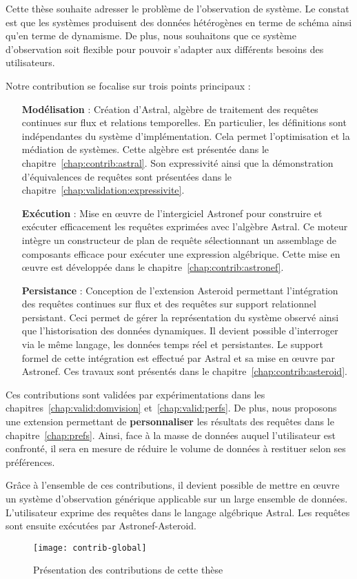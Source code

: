 Cette thèse souhaite adresser le problème de l'observation de système. Le constat est que les systèmes produisent des données hétérogènes en terme de schéma ainsi qu'en terme de dynamisme. De plus, nous souhaitons que ce système d'observation soit flexible pour pouvoir s'adapter aux différents besoins des utilisateurs.

Notre contribution se focalise sur trois points principaux :
\begin{itemize}
 \item[\textbf{Modélisation}] : Création d'Astral, algèbre de traitement des requêtes continues sur flux et relations temporelles. En particulier, les définitions sont indépendantes du système d'implémentation. Cela permet l'optimisation et la médiation de systèmes. Cette algèbre est présentée dans le chapitre~\ref{chap:contrib:astral}. Son expressivité ainsi que la démonstration d'équivalences de requêtes sont présentées dans le chapitre~\ref{chap:validation:expressivite}.
 \item[\textbf{Exécution}] : Mise en œuvre de l'intergiciel Astronef pour construire et exécuter efficacement les requêtes exprimées avec l'algèbre Astral. Ce moteur intègre un constructeur de plan de requête sélectionnant un assemblage de composants efficace pour exécuter une expression algébrique. Cette mise en œuvre est développée dans le chapitre~\ref{chap:contrib:astronef}.
 \item[\textbf{Persistance}] : Conception de l'extension Asteroid permettant l'intégration des requêtes continues sur flux et des requêtes sur support relationnel persistant. Ceci permet de gérer la représentation du système observé ainsi que l'historisation des données dynamiques. Il devient possible d'interroger via le même langage, les données temps réel et persistantes. Le support formel de cette intégration est effectué par Astral et sa mise en œuvre par Astronef. Ces travaux sont présentés dans le chapitre~\ref{chap:contrib:asteroid}.
\end{itemize}

Ces contributions sont validées par expérimentations dans les chapitres~\ref{chap:valid:domvision} et~\ref{chap:valid:perfs}. De plus, nous proposons une extension permettant de \textbf{personnaliser} les résultats des requêtes dans le chapitre~\ref{chap:prefs}. Ainsi, face à la masse de données auquel l'utilisateur est confronté, il sera en mesure de réduire le volume de données à restituer selon ses préférences.

Grâce à l'ensemble de ces contributions, il devient possible de mettre en œuvre un système d'observation générique applicable sur un large ensemble de données. L'utilisateur exprime des requêtes dans le langage algébrique Astral. Les requêtes sont ensuite exécutées par Astronef-Asteroid. 

\begin{figure}[ht]
	\centering
	\texttt{[image: contrib-global]}
	\caption{Présentation des contributions de cette thèse}
\end{figure}
